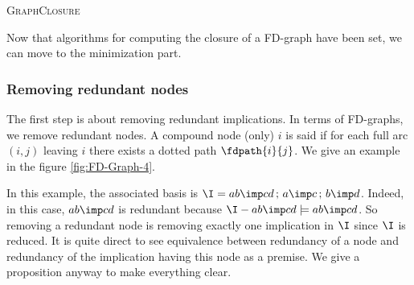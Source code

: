 \begin{algorithm}
	
	\BlankLine
	\BlankLine
	
	
	\caption{\textsc{GraphClosure}}
	\label{alg:FD-Closure}
\end{algorithm}

\vspace{1.2em}

Now that algorithms for computing the closure of a FD-graph have been set, we
can move to the minimization part.

\subsubsection{Removing redundant nodes}

The first step is about removing redundant implications. In terms of FD-graphs, 
we remove redundant nodes. A compound node (only) $i$ is said  if for each full arc $(i, j)$ leaving $i$
there exists a dotted path $\fdpath{i}{j}$. We give an example in the figure
\ref{fig:FD-Graph-4}.

\begin{figure}[ht]

\end{figure}

In this example, the associated basis is $\I = { ab \imp cd \, ; \, a \imp c \, ; \, b \imp d}$. Indeed, in this case, $ab \imp cd$ is 
redundant because $\I - {ab \imp cd} \models ab \imp cd$. So removing a redundant node is removing exactly one implication in $\I$ since $\I$ is reduced. It is quite direct to see equivalence between redundancy of a node and
redundancy of the implication having this node as a premise. We give a 
proposition anyway to make everything clear.


